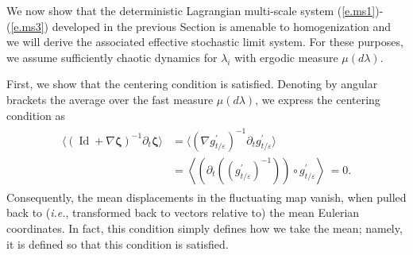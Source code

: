 \documentclass[12pt,onesided]{article}
\def\eps{\varepsilon}
\def\O{{\mathcal{O}}}
\def\bzeta{{\bm{\zeta}}}
\newcommand*{\Id}{\operatorname{Id}}
\begin{document}
We now show that the deterministic Lagrangian multi-scale system (\ref{e.ms1})-(\ref{e.ms3}) developed in the previous Section is amenable to homogenization and we will derive the associated effective stochastic limit system. For these purposes, we assume sufficiently chaotic dynamics for $\lambda_i$ with ergodic measure $\mu(d\lambda)$. 

First, we show that the centering condition is satisfied. Denoting by angular brackets the average over the fast measure $\mu(d\lambda)$, we express the centering condition as
\begin{align}
\begin{split}
\langle\left(\Id+\nabla\bzeta\right)^{-1}\partial_t\bzeta\rangle 
&= \langle\left(\nabla g_{t/\eps}^\prime\right)^{-1}\partial_t g_{t/\eps}^\prime\rangle \\
&= \left\langle\left(\partial_t \left(\left(g_{t/\eps}^\prime\right)^{-1}\right)\right)\circ g_{t/\eps}^\prime \right\rangle\, = 0.
\end{split}
\end{align}
Consequently, the mean displacements in the
fluctuating map vanish, when pulled back to (\emph{i.e.}, transformed back to vectors relative to) the mean
Eulerian coordinates. In fact, this condition simply defines how we
take the mean; namely, it is defined so that  this condition is satisfied.
\end{document}
